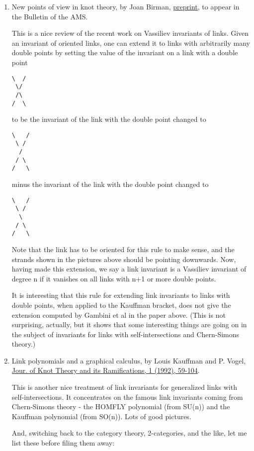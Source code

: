 \begin{enumerate}
\item New points of view in knot theory, by Joan Birman, \href{https://arxiv.org/abs/math/9304209}{preprint}, to appear in the Bulletin of the AMS.

This is a nice review of the recent work on Vassiliev invariants of links. Given an invariant of oriented links, one can extend it to links with arbitrarily many double points by setting the value of the invariant on a link with a double point

\begin{verbatim}
\  /
 \/
 /\
/  \    
\end{verbatim}
to be the invariant of the link with the double point changed to

\begin{verbatim}
\   /
 \ /
  /
 / \
/   \
\end{verbatim}
minus the invariant of the link with the double point changed to

\begin{verbatim}
\   /
 \ /
  \
 / \
/   \
\end{verbatim}
Note that the link has to be oriented for this rule to make sense, and the strands shown in the pictures above should be pointing downwards. Now, having made this extension, we say a link invariant is a Vassiliev invariant of degree n if it vanishes on all links with n+1 or more double points.

It is interesting that this rule for extending link invariants to links with double points, when applied to the Kauffman bracket, does not give the extension computed by Gambini et al in the paper above. (This is not surprising, actually, but it shows that some interesting things are going on in the subject of invariants for links with self-intersections and Chern-Simons theory.)

\item Link polynomials and a graphical calculus, by Louis Kauffman and P. Vogel, \href{https://www.worldscientific.com/doi/abs/10.1142/S021821651240007X}{Jour. of Knot Theory and its Ramifications, 1 (1992), 59-104}.

This is another nice treatment of link invariants for generalized links with self-intersections. It concentrates on the famous link invariants coming from Chern-Simons theory - the HOMFLY polynomial (from SU(n)) and the Kauffman polynomial (from SO(n)). Lots of good pictures.

And, switching back to the category theory, 2-categories, and the like, let me list these before filing them away:


\end{enumerate}
